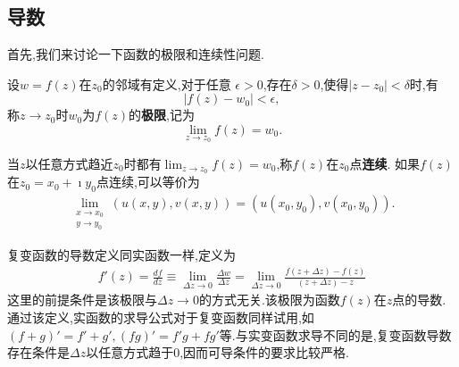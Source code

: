 \subsection{导数}

首先,我们来讨论一下函数的极限和连续性问题.
\begin{definition}
    设$w=f(z)$在$z_0$的邻域有定义,对于任意
$\epsilon > 0$,存在$\delta > 0$,使得$|z-z_0| < \delta$时,有
\begin{equation}
    |f(z) - w_0| < \epsilon ,
\end{equation}
称$z\to z_0$时$w_0$为$f(z)$的{\bf 极限},记为
\begin{equation}
    \lim_{z\to z_0} f(z) = w_0 .
\end{equation}
\end{definition}
当$z$以任意方式趋近$z_0$时都有$ \lim_{z\to z_0} f(z) = w_0$,称$f(z)$在$z_0$点{\bf 连续}.
如果$f(z)$ 在$z_0=x_0 + \imath y_0$点连续,可以等价为
\begin{align}
    \lim_{\substack{x\to x_0\\y\to y_0}} \left(u(x,y), v(x,y)\right) = \left(u(x_0, y_0), v(x_0, y_0)\right) . 
\end{align}

复变函数的导数定义同实函数一样,定义为
\begin{align}
    \label{eq:derivative_def}
    f'(z) = \frac{df}{dz} 
    \equiv\lim_{\Delta z \to 0} \frac{\Delta w} {\Delta z} 
    = \lim_{\Delta z\to 0} \frac{f(z+\Delta z) - f(z) } {(z+\Delta z ) - z}
\end{align}
这里的前提条件是该极限与$\Delta z \to 0$的方式无关.该极限为函数$f(z)$在$z$点的导数.通过该定义,实函数的求导公式对于复变函数同样试用,如
$(f+g)' = f' + g', (fg)' =f'g + fg'$等.与实变函数求导不同的是,复变函数导数存在条件是$\Delta z$以任意方式趋于$0$,因而可导条件的要求比较严格.

